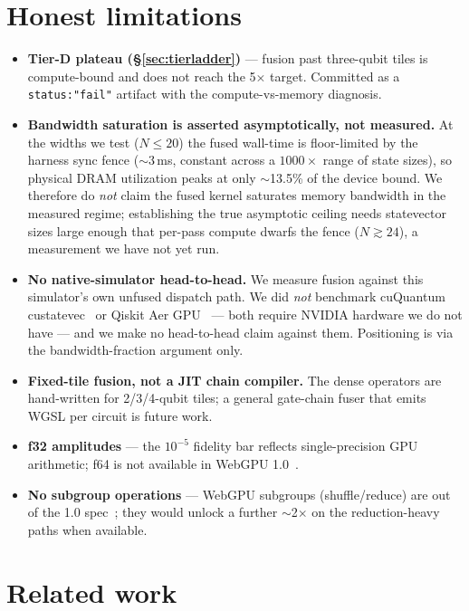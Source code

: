 \documentclass[11pt]{article}
\begin{document}
\section{Honest limitations}
\label{sec:fusionlimits}

\begin{itemize}
  \item \textbf{Tier-D plateau (\S\ref{sec:tierladder})} --- fusion past
  three-qubit tiles is compute-bound and does not reach the 5$\times$ target.
  Committed as a \texttt{status:"fail"} artifact with the compute-vs-memory
  diagnosis.
  \item \textbf{Bandwidth saturation is asserted asymptotically, not measured.}
  At the widths we test ($N\le20$) the fused wall-time is floor-limited by the
  harness sync fence ($\sim$3\,ms, constant across a $1000\times$ range of state
  sizes), so physical DRAM utilization peaks at only $\sim$13.5\% of the device
  bound. We therefore do \emph{not} claim the fused kernel saturates memory
  bandwidth in the measured regime; establishing the true asymptotic ceiling
  needs statevector
  sizes large enough that per-pass compute dwarfs the fence ($N\gtrsim24$), a
  measurement we have not yet run.
  \item \textbf{No native-simulator head-to-head.} We measure fusion against
  this simulator's own unfused dispatch path. We did \emph{not} benchmark
  cuQuantum custatevec~\cite{cuquantum} or Qiskit Aer GPU~\cite{qiskit} ---
  both require NVIDIA hardware we do not have --- and we make no head-to-head
  claim against them. Positioning is via the bandwidth-fraction argument only.
  \item \textbf{Fixed-tile fusion, not a JIT chain compiler.} The dense
  operators are hand-written for 2/3/4-qubit tiles; a general gate-chain fuser
  that emits WGSL per circuit is future work.
  \item \textbf{f32 amplitudes} --- the $10^{-5}$ fidelity bar reflects
  single-precision GPU arithmetic; f64 is not available in WebGPU
  1.0~\cite{webgpuspec}.
  \item \textbf{No subgroup operations} --- WebGPU subgroups (shuffle/reduce)
  are out of the 1.0 spec~\cite{webgpuspec}; they would unlock a further
  $\sim$2$\times$ on the reduction-heavy paths when available.
\end{itemize}

\section{Related work}
\end{document}
